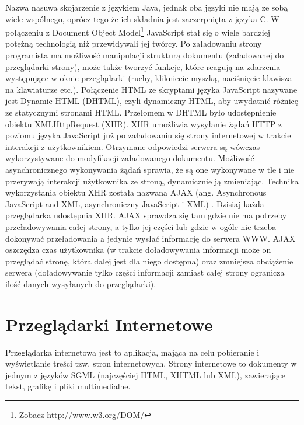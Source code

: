 \documentclass[a4paper,12pt,oneside]{report}
\begin{document}
Nazwa nasuwa skojarzenie z językiem Java, jednak oba języki nie mają ze sobą wiele wspólnego, oprócz tego że ich składnia jest zaczerpnięta z języka C. W połączeniu z Document Object Model\footnote{Zobacz \url{http://www.w3.org/DOM/}} JavaScript stał się o wiele bardziej potężną technologią niż przewidywali jej twórcy. Po załadowaniu strony programista ma możliwość manipulacji strukturą dokumentu (załadowanej do przeglądarki strony), może także tworzyć funkcje, które reagują na zdarzenia występujące w oknie przeglądarki (ruchy, klikniecie myszką, naciśnięcie klawisza na klawiaturze etc.). Połączenie HTML ze skryptami języka JavaScript nazywane jest Dynamic HTML (DHTML), czyli dynamiczny HTML, aby uwydatnić różnicę ze statycznymi stronami HTML. 
Przełomem w DHTML było udostępnienie obiektu XMLHttpRequest (XHR). XHR umożliwia wysyłanie żądań HTTP z poziomu języka JavaScript już po załadowaniu się strony internetowej w trakcie interakcji z użytkownikiem. Otrzymane odpowiedzi serwera są wówczas wykorzystywane do modyfikacji załadowanego dokumentu. Możliwość asynchronicznego wykonywania żądań sprawia, że są one wykonywane w tle i nie przerywają interakcji użytkownika ze stroną, dynamicznie ją zmieniając. Technika wykorzystania obiektu XHR została nazwana AJAX (ang. Asynchronous JavaScript and XML, asynchroniczny JavaScript i XML) . Dzisiaj każda przeglądarka udostępnia XHR. AJAX sprawdza się tam gdzie nie ma potrzeby przeładowywania całej strony, a tylko jej części lub gdzie w ogóle nie trzeba dokonywać przeładowania a jedynie wysłać informację do serwera WWW. AJAX oszczędza czas użytkownika (w trakcie doładowywania informacji może on przeglądać stronę, która dalej jest dla niego dostępna) oraz zmniejsza obciążenie serwera (doładowywanie tylko części informacji zamiast całej strony ogranicza ilość danych wysyłanych do przeglądarki). 

\section{Przeglądarki Internetowe}
\label{sec:przegladarki}

Przeglądarka internetowa jest to aplikacja, mająca na celu pobieranie i wyświetlanie treści tzw. stron internetowych. Strony internetowe to dokumenty w jednym z języków SGML (najczęściej HTML, XHTML lub XML), zawierające tekst, grafikę i pliki multimedialne.
\end{document}
